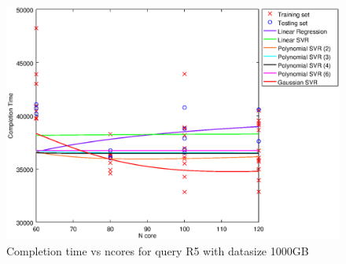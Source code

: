 
\begin {figure}[hbtp]
\centering
\includegraphics[width=\textwidth]{output/R5_1000_1_OVER_NCORES/plot_R5_1000.eps}
\caption{Completion time vs ncores for query R5 with datasize 1000GB}
\label{fig:all_nonlinear_R5_1000}
\end {figure}
